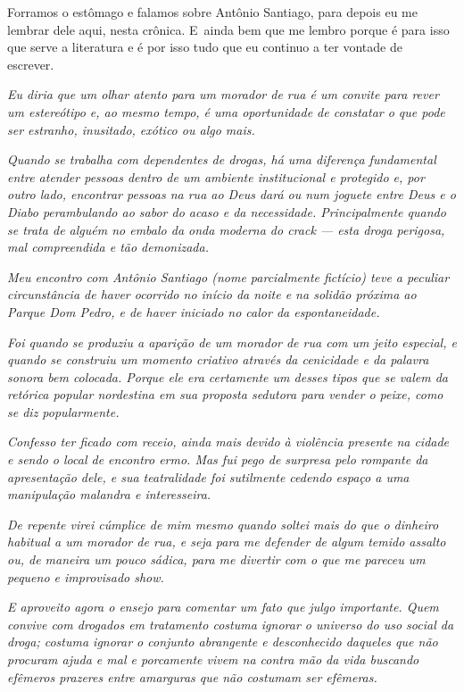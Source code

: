 Forramos o estômago e falamos sobre Antônio Santiago, para depois eu me
lembrar dele aqui, nesta crônica. E~ainda bem que me lembro porque é
para isso que serve a literatura e é por isso tudo que eu continuo a ter
vontade de escrever.~

\begin{center}\asterisc{}\end{center}


\emph{Eu diria que um olhar atento para um morador de rua é um convite
para rever um estereótipo e, ao mesmo tempo, é uma oportunidade de
constatar o que pode ser estranho, inusitado, exótico ou algo mais.}~

\emph{Quando se trabalha com dependentes de drogas, há uma diferença
fundamental entre atender pessoas dentro de um ambiente institucional e
protegido e, por outro lado, encontrar pessoas na rua ao Deus dará ou
num joguete entre Deus e o Diabo perambulando ao sabor do acaso e da
necessidade. Principalmente quando se trata de alguém no embalo da onda
moderna do crack --- esta droga perigosa, mal compreendida e tão
demonizada.}~

\emph{Meu encontro com Antônio Santiago (nome parcialmente fictício)
teve a peculiar circunstância de haver ocorrido no início da noite e na
solidão próxima ao Parque Dom Pedro, e de haver iniciado no calor da
espontaneidade.}~

\emph{Foi quando se produziu a aparição de um morador de rua com um
jeito especial, e quando se construiu um momento criativo através da
cenicidade e da palavra sonora bem colocada. Porque ele era certamente
um desses tipos que se valem da retórica popular nordestina em sua
proposta sedutora para vender o peixe, como se diz popularmente.}~

\emph{Confesso ter ficado com receio, ainda mais devido à violência
presente na cidade e sendo o local de encontro ermo. Mas fui pego de
surpresa pelo rompante da apresentação dele, e sua teatralidade foi
sutilmente cedendo espaço a uma manipulação malandra e interesseira.}~

\emph{De repente virei cúmplice de mim mesmo quando soltei mais do que o
dinheiro habitual a um morador de rua, e seja para me defender de algum
temido assalto ou, de maneira um pouco sádica, para me divertir com o
que me pareceu um pequeno e improvisado show.}~

\emph{E aproveito agora o ensejo para comentar um fato que julgo
importante. Quem convive com drogados em tratamento costuma ignorar o
universo do uso social da droga; costuma ignorar o conjunto abrangente e
desconhecido daqueles que não procuram ajuda e mal e porcamente vivem na
contra mão da vida buscando efêmeros prazeres entre amarguras que não
costumam ser efêmeras.}~

